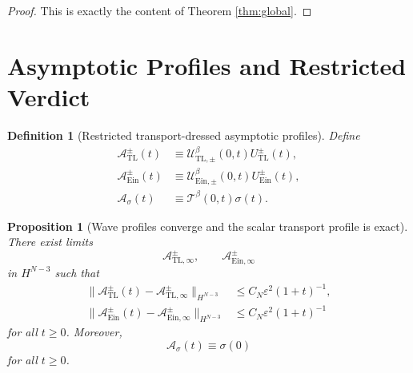 \documentclass[11pt]{article}
\newtheorem{definition}{Definition}
\newtheorem{proposition}{Proposition}
\begin{document}
\begin{proof}
This is exactly the content of Theorem \ref{thm:global}.
\end{proof}

\section{Asymptotic Profiles and Restricted Verdict}

\begin{definition}[Restricted transport-dressed asymptotic profiles]
\label{def:profiles}
Define
\begin{align}
\mathcal A_{\mathrm{TL}}^\pm(t)
&\equiv
\mathcal U_{\mathrm{TL},\pm}^\beta(0,t)U_{\mathrm{TL}}^\pm(t),
\label{eq:ATL}
\\
\mathcal A_{\mathrm{Ein}}^\pm(t)
&\equiv
\mathcal U_{\mathrm{Ein},\pm}^\beta(0,t)U_{\mathrm{Ein}}^\pm(t),
\label{eq:AEin}
\\
\mathcal A_\sigma(t)
&\equiv
\mathcal T^\beta(0,t)\sigma(t).
\label{eq:Asig}
\end{align}
\end{definition}

\begin{proposition}[Wave profiles converge and the scalar transport profile is exact]
\label{prop:cauchy}
There exist limits
\[
\mathcal A_{\mathrm{TL},\infty}^\pm,
\qquad
\mathcal A_{\mathrm{Ein},\infty}^\pm
\]
in \(H^{N-3}\) such that
\begin{align}
\|\mathcal A_{\mathrm{TL}}^\pm(t)-\mathcal A_{\mathrm{TL},\infty}^\pm\|_{H^{N-3}}
&\le
C_N\varepsilon^2(1+t)^{-1},
\label{eq:ATLlimit}
\\
\|\mathcal A_{\mathrm{Ein}}^\pm(t)-\mathcal A_{\mathrm{Ein},\infty}^\pm\|_{H^{N-3}}
&\le
C_N\varepsilon^2(1+t)^{-1}
\label{eq:AEinlimit}
\end{align}
for all \(t\ge 0\). Moreover,
\begin{equation}
\mathcal A_\sigma(t)\equiv \sigma(0)
\label{eq:Asigconst}
\end{equation}
for all \(t\ge 0\).
\end{proposition}
\end{document}
